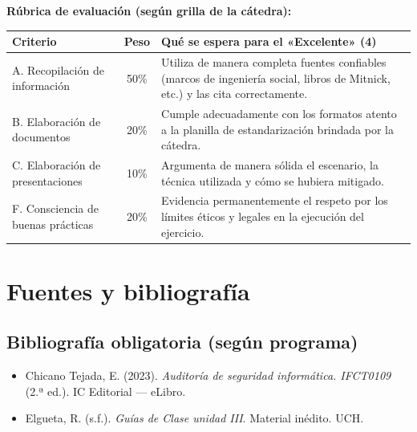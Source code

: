 \documentclass[11pt,a4paper]{article}
\begin{document}
\textbf{Rúbrica de evaluación (según grilla de la cátedra):}
\begin{center}
\renewcommand{\arraystretch}{1.2}
\begin{tabularx}{\textwidth}{@{} l c X @{}}
\toprule
\textbf{Criterio} & \textbf{Peso} & \textbf{Qué se espera para el «Excelente» (4)} \\
\midrule
A. Recopilación de información & 50\% & Utiliza de manera completa fuentes confiables (marcos de ingeniería social, libros de Mitnick, etc.) y las cita correctamente. \\
B. Elaboración de documentos & 20\% & Cumple adecuadamente con los formatos atento a la planilla de estandarización brindada por la cátedra. \\
C. Elaboración de presentaciones & 10\% & Argumenta de manera sólida el escenario, la técnica utilizada y cómo se hubiera mitigado. \\
F. Consciencia de buenas prácticas & 20\% & Evidencia permanentemente el respeto por los límites éticos y legales en la ejecución del ejercicio. \\
\bottomrule
\end{tabularx}
\end{center}

\section{Fuentes y bibliografía}

\subsection{Bibliografía obligatoria (según programa)}
\begin{itemize}[leftmargin=*]
  \item Chicano Tejada, E. (2023). \textit{Auditoría de seguridad informática. IFCT0109} (2.ª ed.). IC Editorial --- eLibro.
  \item Elgueta, R. (s.f.). \textit{Guías de Clase unidad III}. Material inédito. UCH.
\end{itemize}
\end{document}
